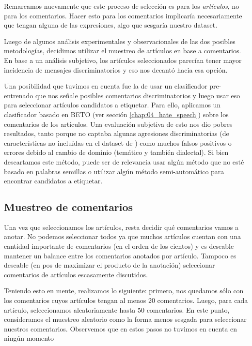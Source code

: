 Remarcamos nuevamente que este proceso de selección es para los \emph{artículos}, no para los comentarios. Hacer esto para los comentarios implicaría necesariamente que tengan alguna de las expresiones, algo que sesgaría nuestro dataset.

Luego de algunos análisis experimentales y observacionales de las dos posibles metodologías, decidimos utilizar el muestreo de artículos en base a comentarios. En base a un análisis subjetivo, los artículos seleccionados parecían tener mayor incidencia de mensajes discriminatorios y eso nos decantó hacia esa opción.

Una posibilidad que tuvimos en cuenta fue la de usar un clasificador pre-entrenado que nos señale posibles comentarios discriminatorios y luego usar eso para seleccionar artículos candidatos a etiquetar. Para ello, aplicamos un clasificador basado en BETO \citet{canete2020spanish} (ver sección \ref{chap:04_hate_speech}) sobre los comentarios de los artículos. Una evaluación subjetiva de esto nos dio pobres resultados, tanto porque no captaba algunas agresiones discriminatorias (de características no incluídas en el dataset de \citet{hateval2019semeval}) como muchos falsos positivos o errores debido al cambio de dominio (temático y también dialectal). Si bien descartamos este método, puede ser de relevancia usar algún método que no esté basado en palabras semillas o utilizar algún método semi-automático para encontrar candidatos a etiquetar.


\subsection{Muestreo de comentarios}

Una vez que seleccionamos los artículos, resta decidir qué comentarios vamos a anotar. No podemos seleccionar todos ya que muchos artículos cuentan con una cantidad importante de comentarios (en el orden de los cientos) y es deseable mantener un balance entre los comentarios anotados por artículo. Tampoco es deseable (en pos de maximizar el producto de la anotación) seleccionar comentarios de artículos escasamente discutidos.

Teniendo esto en mente, realizamos lo siguiente: primero, nos quedamos sólo con los comentarios cuyos artículos tengan al menos 20 comentarios. Luego, para cada artículo, seleccionamos aleatoriamente hasta 50 comentarios. En este punto, consideramos el muestreo aleatorio como la forma menos sesgada para seleccionar nuestros comentarios. Observemos que en estos pasos no tuvimos en cuenta en ningún momento


